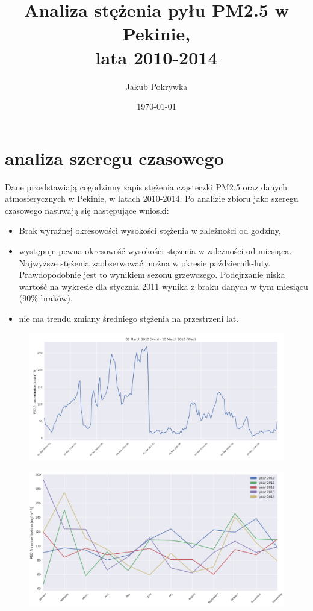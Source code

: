 \documentclass{beamer}
\title[analiza stężenia PM2.5]{Analiza stężenia pyłu PM2.5 w Pekinie, \\ lata 2010-2014}
\author{Jakub Pokrywka}
\institute[]
{\medskip
	\textit{jakubpokrywka@gmail.com} %
}
\date{\today}
\begin{document}
\begin{frame}
	\titlepage
\end{frame}

\section{analiza szeregu czasowego}
\begin{frame}
	Dane przedstawiają cogodzinny zapis stężenia cząsteczki PM2.5 oraz danych atmosferycznych w Pekinie, w latach 2010-2014.
	Po analizie zbioru jako szeregu czasowego nasuwają się następujące wnioski:
	\begin{itemize}
		\item Brak wyraźnej okresowości wysokości stężenia w zależności od godziny,
		\item występuje pewna okresowość wysokości stężenia w zależności od miesiąca. Najwyższe stężenia zaobserwować można w okresie październik-luty.
			Prawdopodobnie jest to wynikiem sezonu grzewczego.
			Podejrzanie niska wartość na wykresie dla stycznia 2011 wynika z braku danych w tym miesiącu (90\% braków).
		\item nie ma trendu zmiany średniego stężenia na przestrzeni lat.
	\end{itemize}
\end{frame}

\begin{frame}
	\begin{figure}
		\includegraphics[width=1\linewidth]{time-period}
	\end{figure}
\end{frame}


\begin{frame}
	\begin{figure}
		\includegraphics[width=1\linewidth]{month-years}
	\end{figure}
\end{frame}
\end{document}
